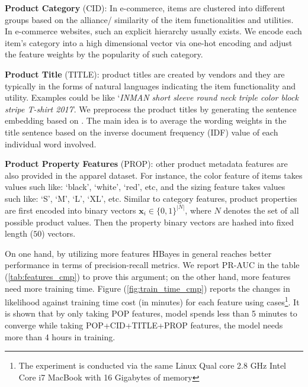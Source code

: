{\textbf{Product Category} (CID): In e-commerce, items are clustered into different groups based on the alliance/ similarity of the item functionalities and utilities.  In e-commerce websites, such an explicit hierarchy usually exists.  We encode each item's category into a high dimensional vector via one-hot encoding and adjust the feature weights by the popularity of such category. \newline

\textbf{Product Title} (TITLE): product titles are created by vendors and they are typically in the forms of natural languages indicating the item functionality and utility.  Examples could be like `\emph{INMAN short sleeve round neck triple color block stripe T-shirt 2017}'.  We preprocess the product titles by generating the sentence embedding based on \cite{de2016representation}.  The main idea is to average the wording weights in the title sentence based on the inverse document frequency (IDF) value of each individual word involved. \newline

\textbf{Product Property Features} (PROP): other product metadata features are also provided in the apparel dataset. For instance, the color feature of items takes values such like: `black', `white', `red', etc, and the sizing feature takes values such like: `S', `M', `L', `XL', etc.  Similar to category features, product properties are first encoded into binary vectors $\bm{x}_i \in \{0, 1\}^{|N|}$, where $N$ denotes the set of all possible product values.  Then the property binary vectors are hashed into fixed length ($50$) vectors. \newline

On one hand, by utilizing more features HBayes in general reaches better performance in terms of precision-recall metrics.  We report PR-AUC in the table (\ref{tab:features_cmp}) to prove this argument; on the other hand, more features need more training time.  Figure (\ref{fig:train_time_cmp}) reports the changes in likelihood against training time cost (in minutes) for each feature using cases\footnote{The experiment is conducted via the same Linux Qual core 2.8 GHz Intel Core i7 MacBook with 16 Gigabytes of memory}. It is shown that by only taking POP features, model spends less than 5 minutes to converge while taking POP+CID+TITLE+PROP features, the model needs more than 4 hours in training.   

\begin{table}[htb]
\centering
{}
\caption{Model performance under different feature combinations in terms of PR AUC}
\label{tab:features_cmp}
\end{table}

}
